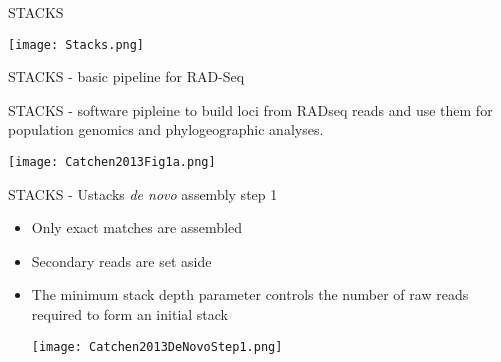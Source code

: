 \documentclass[presentation]{beamer}
\begin{document}
\begin{frame}[label={sec:orgd58ea8a}]{STACKS \citep{Puritz2014}}
\begin{latex}
\begin{center}
\end{latex}

\begin{center}
\texttt{[image: Stacks.png]}
\end{center}

\begin{latex}
\end{center}
\end{latex}
\end{frame}
\begin{frame}[label={sec:org892a956}]{STACKS - basic pipeline for RAD-Seq}
\begin{latex}
\begin{center}
\end{latex}
STACKS - software pipleine to build loci from RADseq reads and use
them for population genomics and phylogeographic analyses.

\begin{center}
\texttt{[image: Catchen2013Fig1a.png]}
\end{center}

\end{frame}


\begin{frame}[label={sec:org43367b7}]{STACKS - Ustacks \emph{de novo} assembly step 1}
\begin{itemize}
\item Only exact matches are assembled
\item Secondary reads are set aside
\item The minimum stack depth parameter controls the number of raw reads  required to form an initial stack
\begin{latex}
\begin{center}
\end{latex}
\begin{center}
\texttt{[image: Catchen2013DeNovoStep1.png]}
\end{center}

\end{itemize}
\end{frame}
\end{document}
